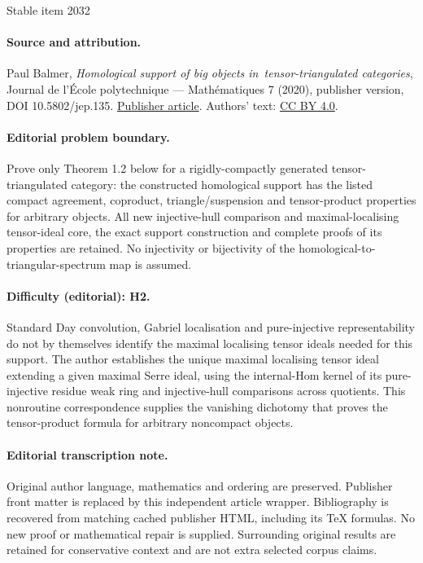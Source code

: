 \documentclass[11pt]{article}
\numberwithin{equation}{section}
\theoremstyle{definition}
\begin{document}
\begin{center}{\Large Stable item 2032}\end{center}
\paragraph{Source and attribution.}
Paul Balmer, \emph{Homological support of big objects in tensor-triangulated categories}, Journal de l’École polytechnique — Mathématiques 7 (2020), publisher version, DOI 10.5802/jep.135. \href{https://jep.centre-mersenne.org/articles/10.5802/jep.135/}{Publisher article}. Authors' text: \href{https://creativecommons.org/licenses/by/4.0/}{CC BY 4.0}.
\paragraph{Editorial problem boundary.}
Prove only Theorem 1.2 below for a rigidly-compactly generated tensor-triangulated category: the constructed homological support has the listed compact agreement, coproduct, triangle/suspension and tensor-product properties for arbitrary objects. All new injective-hull comparison and maximal-localising tensor-ideal core, the exact support construction and complete proofs of its properties are retained. No injectivity or bijectivity of the homological-to-triangular-spectrum map is assumed.
\paragraph{Difficulty (editorial): H2.}
Standard Day convolution, Gabriel localisation and pure-injective representability do not by themselves identify the maximal localising tensor ideals needed for this support. The author establishes the unique maximal localising tensor ideal extending a given maximal Serre ideal, using the internal-Hom kernel of its pure-injective residue weak ring and injective-hull comparisons across quotients. This nonroutine correspondence supplies the vanishing dichotomy that proves the tensor-product formula for arbitrary noncompact objects.
\paragraph{Editorial transcription note.}
Original author language, mathematics and ordering are preserved. Publisher front matter is replaced by this independent article wrapper. Bibliography is recovered from matching cached publisher HTML, including its TeX formulas. No new proof or mathematical repair is supplied. Surrounding original results are retained for conservative context and are not extra selected corpus claims.
\clearpage
\end{document}
